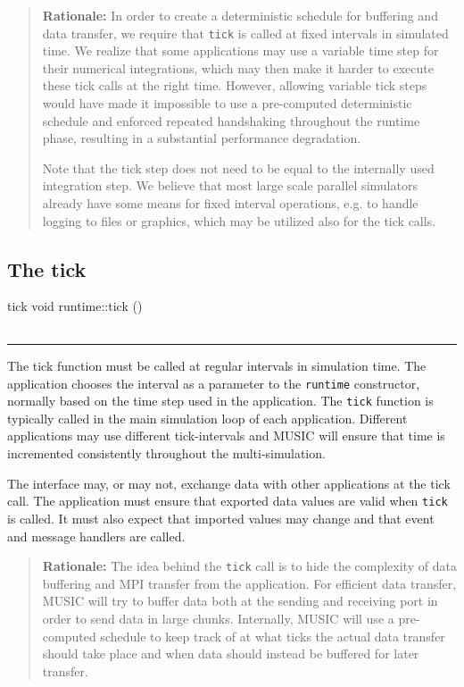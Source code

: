 \documentclass[a4paper]{report}
\makeatletter
\newenvironment{rationale}%
{\par\begin{quote}\textbf{Rationale:}}%
{\par\end{quote}}
\newenvironment{parameters}%
{\begin{tabular}{@{\hspace{2em}}lp{0.6\textwidth}}}%
{\end{tabular}\par\vspace{1mm}\par\hrule\par\vspace{5mm}}
\makeatother
\begin{document}
\begin{rationale}
  In order to create a deterministic schedule for buffering and data
  transfer, we require that \lstinline|tick| is called at fixed
  intervals in simulated time.  We realize that some applications may
  use a variable time step for their
  numerical integrations, which may then make it harder to execute
  these tick calls at the right time.  However, allowing variable tick
  steps would have made it impossible to use a pre-computed
  deterministic schedule and enforced repeated handshaking throughout
  the runtime phase, resulting in a substantial performance
  degradation.

  Note that the tick step does not need to be equal to the internally
  used integration step.  We believe that most
  large scale parallel simulators already have some means for fixed
  interval operations, e.g. to handle logging to files or graphics,
  which may be utilized also for the tick calls.
\end{rationale}


\subsection{The tick}

\begin{head}{tick}
  void runtime::tick ()
\end{head}
\begin{parameters}
\end{parameters}

The tick function must be called at regular intervals in simulation
time.  The application chooses the interval as a parameter to the
\lstinline|runtime| constructor, normally based on the time step used
in the application.  The \lstinline|tick| function is typically called
in the main simulation loop of each application.  Different
applications may use different tick-intervals and MUSIC will ensure
that time is incremented consistently throughout the multi-simulation.

The interface may, or may not, exchange data with other applications
at the tick call.  The application must ensure that exported data
values are valid when \lstinline|tick| is called.  It must also expect
that imported values may change and that event and message handlers
are called.

\begin{rationale}
  The idea behind the \lstinline|tick| call is to hide the complexity
  of data buffering and MPI transfer from the application.  For
  efficient data transfer, MUSIC will try to buffer data both at the
  sending and receiving port in order to send data in large chunks.
  Internally, MUSIC will use a pre-computed schedule to keep track of
  at what ticks the actual data transfer should take place and when
  data should instead be buffered for later transfer.
\end{rationale}
\end{document}
